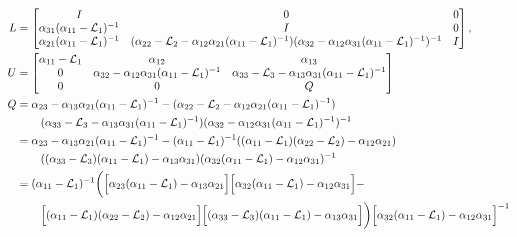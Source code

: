 \documentclass[a4paper,10pt]{article}
\begin{document}
\begin{align*}
L & = 
\begin{bmatrix}
I & 0 & 0 \\
\alpha_{31} (\alpha_{11} - \mathcal{L}_1)^{-1} & I & 0 \\
\alpha_{21} (\alpha_{11} - \mathcal{L}_1)^{-1} & (\alpha_{22} - \mathcal{L}_2 - \alpha_{12} \alpha_{21} (\alpha_{11} - \mathcal{L}_1)^{-1}) (\alpha_{32} - 
\alpha_{12} \alpha_{31} (\alpha_{11} - \mathcal{L}_1)^{-1})^{-1} & I
\end{bmatrix} ,
\\
U & = \begin{bmatrix}
\alpha_{11} - \mathcal{L}_1 & \alpha_{12} & \alpha_{13} \\
0 & \alpha_{32} - \alpha_{12} \alpha_{31} (\alpha_{11} - \mathcal{L}_1)^{-1} & \alpha_{33} - \mathcal{L}_3 - \alpha_{13} \alpha_{31} (\alpha_{11} - \mathcal{L}_1)^{-1} \\
0 & 0 & Q
\end{bmatrix}
\\
Q & = \alpha_{23} - 
\alpha_{13} \alpha_{21} (\alpha_{11} - \mathcal{L}_1)^{-1} -
	(\alpha_{22} - \mathcal{L}_2 - \alpha_{12} \alpha_{21} (\alpha_{11} - \mathcal{L}_1)^{-1}) \\
	&\hspace{5ex}
	(\alpha_{33} - \mathcal{L}_3 - \alpha_{13} \alpha_{31} (\alpha_{11} - \mathcal{L}_1)^{-1})
	(\alpha_{32} - \alpha_{12} \alpha_{31} (\alpha_{11} - \mathcal{L}_1)^{-1})^{-1}
\\
& = \alpha_{23} - 
\alpha_{13} \alpha_{21} (\alpha_{11} - \mathcal{L}_1)^{-1} -
	(\alpha_{11} - \mathcal{L}_1)^{-1}((\alpha_{11} - \mathcal{L}_1)(\alpha_{22} - \mathcal{L}_2) -
		\alpha_{12} \alpha_{21}) \\
	&\hspace{5ex}
	((\alpha_{33} - \mathcal{L}_3)(\alpha_{11} - \mathcal{L}_1) - \alpha_{13} \alpha_{31})
	(\alpha_{32}(\alpha_{11} - \mathcal{L}_1) - \alpha_{12} \alpha_{31})^{-1}
\\
& = (\alpha_{11} - \mathcal{L}_1)^{-1} \bigg( \Big[\alpha_{23}(\alpha_{11} - \mathcal{L}_1) -
	\alpha_{13} \alpha_{21}\Big]\Big[\alpha_{32}(\alpha_{11} - \mathcal{L}_1) - \alpha_{12} \alpha_{31}\Big]
	- \\\
	&\hspace{5ex}
	\Big[(\alpha_{11} - \mathcal{L}_1)(\alpha_{22} - \mathcal{L}_2) - \alpha_{12} \alpha_{21}\Big]
	\Big[(\alpha_{33} - \mathcal{L}_3)(\alpha_{11} - \mathcal{L}_1) - \alpha_{13} \alpha_{31}\Big]
	\bigg)\Big[\alpha_{32}(\alpha_{11} - \mathcal{L}_1) - \alpha_{12} \alpha_{31}\Big]^{-1}
\end{align*}
\end{document}
